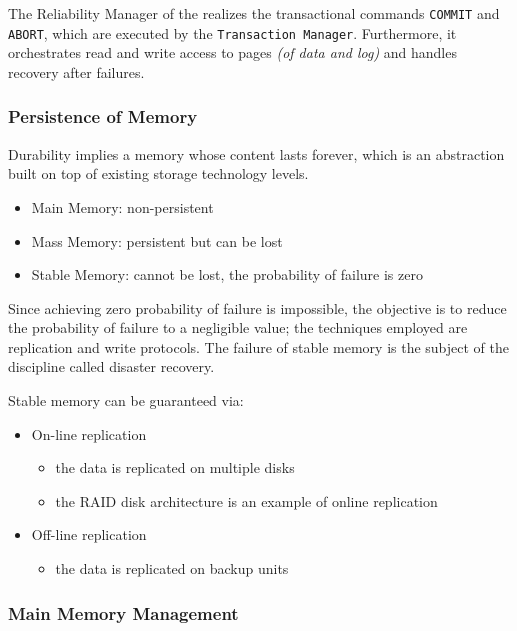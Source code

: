 \documentclass[english]{article}
\begin{document}
The Reliability Manager of the \dbms realizes the transactional commands \texttt{COMMIT} and \texttt{ABORT}, which are executed by the \texttt{Transaction Manager}.
Furthermore, it orchestrates read and write access to pages \textit{(of data and log)} and handles recovery after failures.

\subsubsection{Persistence of Memory}

Durability implies a memory whose content lasts forever, which is an abstraction built on top of existing storage technology levels.

\begin{itemize}
  \item Main Memory: non-persistent
  \item Mass Memory: persistent but can be lost
  \item Stable Memory: cannot be lost, the probability of failure is zero
\end{itemize}

Since achieving zero probability of failure is impossible, the objective is to reduce the probability of failure to a negligible value;
the techniques employed are replication and write protocols.
The failure of stable memory is the subject of the discipline called disaster recovery.

\bigskip
Stable memory can be guaranteed via:

\begin{itemize}
  \item On-line replication
        \begin{itemize}
          \item the data is replicated on multiple disks
          \item the RAID disk architecture is an example of online replication
        \end{itemize}
  \item Off-line replication
        \begin{itemize}
          \item the data is replicated on backup units
        \end{itemize}
\end{itemize}

\subsubsection{Main Memory Management}
\end{document}
